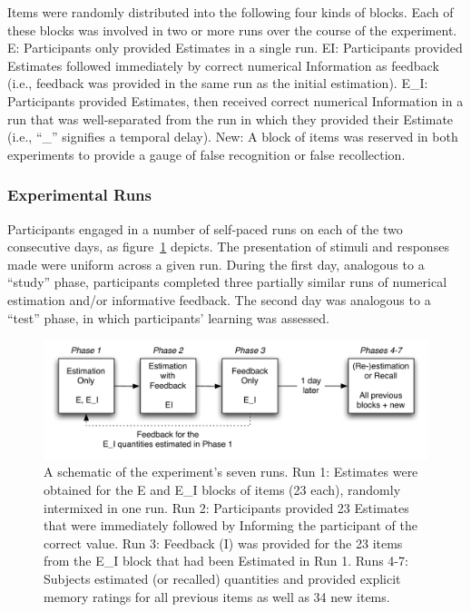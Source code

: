 Items were randomly distributed into the following four kinds of blocks. Each of
these blocks was involved in two or more runs over the course of the experiment.
E: Participants only provided Estimates in a single run. EI: Participants
provided Estimates followed immediately by correct numerical Information as
feedback (i.e., feedback was provided in the same run as the initial
estimation). E\_I: Participants provided Estimates, then received correct
numerical Information in a run that was well-separated from the run in which
they provided their Estimate (i.e., ``\_'' signifies a temporal delay). New: A
block of items was reserved in both experiments to provide a gauge of false
recognition or false recollection.

\subsubsection{Experimental Runs}

Participants engaged in a number of self-paced runs on each of the two
consecutive days, as figure~\ref{ei-procedure} depicts. The presentation of
stimuli and responses made were uniform across a given run. During the first
day, analogous to a ``study'' phase, participants completed three partially
similar runs of numerical estimation and/or informative feedback. The second day
was analogous to a ``test'' phase, in which participants’ learning was assessed.

 
\begin{figure}[h]
\includegraphics[width=\textwidth]{Experiment1-procedure.pdf}
\caption{A schematic of the experiment's seven runs. Run 1:
Estimates were obtained for the E and E\_I blocks of items (23 each), randomly
intermixed in one run. Run 2: Participants provided 23 Estimates that were
immediately followed by Informing the participant of the correct value. Run 3:
Feedback (I) was provided for the 23 items from the E\_I block that had been
Estimated in Run 1. Runs 4-7: Subjects estimated (or recalled) quantities and
provided explicit memory ratings for all previous items as well as 34 new
items.}
\label{ei-procedure} 
\end{figure}

